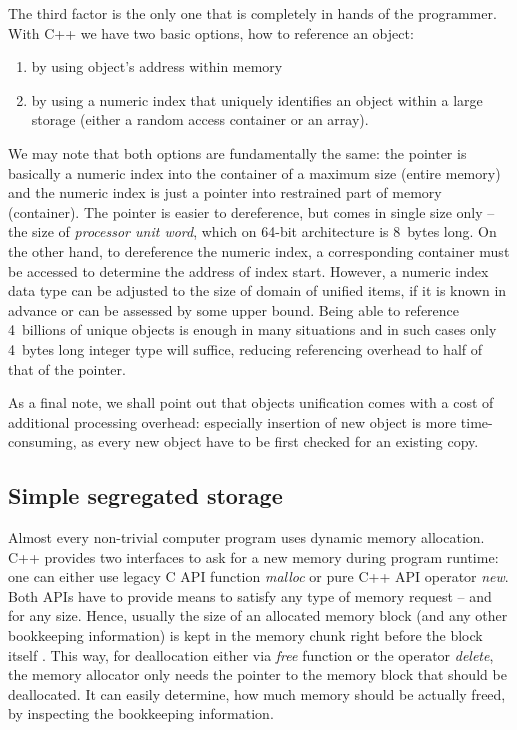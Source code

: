 The third factor is the only one that is completely in hands of the programmer.
With C++ we have two basic options, how to reference an object:
\begin{enumerate}
  \item by using object's address within memory
  \item by using a numeric index that uniquely identifies an object within a large storage
  (either a random access container or an array).
\end{enumerate}

We may note that both options are fundamentally the same:
the pointer is basically a numeric index into the container of a maximum size (entire memory)
and the numeric index is just a pointer into restrained part of memory (container).
The pointer is easier to dereference, but comes in single size only -- the size of
\emph{processor unit word}, which on 64-bit architecture is 8~bytes long.
On the other hand, to dereference the numeric index, a corresponding container must be
accessed to determine the address of index start.
However, a numeric index data type can be adjusted to the size of domain of unified items,
if it is known in advance or can be assessed by some upper bound.
Being able to reference 4~billions of unique objects is enough in many situations and
in such cases only 4~bytes long integer type will suffice, reducing referencing overhead
to half of that of the pointer.

As a final note, we shall point out that objects unification comes with a cost of
additional processing overhead: especially insertion of new object is more time-consuming,
as every new object have to be first checked for an existing copy.

\subsection{Simple segregated storage}
\label{sec:simple-segregated-storage}

Almost every non-trivial computer program uses dynamic memory allocation.
C++ provides two interfaces to ask for a new memory during program runtime:
one can either use legacy C API function \emph{malloc} or pure C++ API operator \emph{new}.
Both APIs have to provide means to satisfy any type of memory request -- and for any size.
Hence, usually the size of an allocated memory block (and any other bookkeeping information) is
kept in the memory chunk right before the block itself \citep[Chapter 10]{meyers:effective-cpp}.
This way, for deallocation either via \emph{free} function or the operator \emph{delete},
the memory allocator only needs the pointer to the memory block that should be deallocated.
It can easily determine, how much memory should be actually freed, by inspecting the
bookkeeping information.

